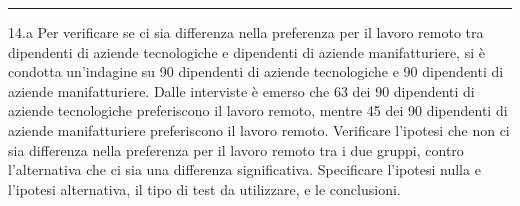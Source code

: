 \documentclass[
  11pt,
]{book}
\theoremstyle{mytheoremstyle}
\theoremstyle{mydefstyle}
\begin{document}
\begin{center}\rule{0.5\linewidth}{0.5pt}\end{center}

14.a Per verificare se ci sia differenza nella preferenza per il lavoro remoto tra dipendenti di aziende tecnologiche e dipendenti di aziende manifatturiere, si è condotta un'indagine su 90 dipendenti di aziende tecnologiche e 90 dipendenti di aziende manifatturiere. Dalle interviste è emerso che 63 dei 90 dipendenti di aziende tecnologiche preferiscono il lavoro remoto, mentre 45 dei 90 dipendenti di aziende manifatturiere preferiscono il lavoro remoto. Verificare l'ipotesi che non ci sia differenza nella preferenza per il lavoro remoto tra i due gruppi, contro l'alternativa che ci sia una differenza significativa. Specificare l'ipotesi nulla e l'ipotesi alternativa, il tipo di test da utilizzare, e le conclusioni.
\end{document}
